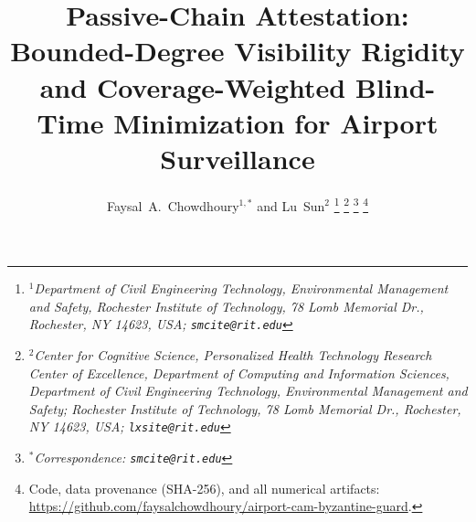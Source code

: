 \documentclass[journal]{IEEEtran}
\theoremstyle{remark}
\begin{document}
\title{Passive-Chain Attestation: Bounded-Degree Visibility Rigidity and Coverage-Weighted Blind-Time Minimization for Airport Surveillance}

\author{Faysal~A.~Chowdhoury$^{1,*}$ and Lu~Sun$^{2}$%
\thanks{\textit{$^{1}$Department of Civil Engineering Technology, Environmental Management and Safety, Rochester Institute of Technology, 78 Lomb Memorial Dr., Rochester, NY 14623, USA; \nolinkurl{smcite@rit.edu}}}%
\thanks{\textit{$^{2}$Center for Cognitive Science, Personalized Health Technology Research Center of Excellence, Department of Computing and Information Sciences, Department of Civil Engineering Technology, Environmental Management and Safety; Rochester Institute of Technology, 78 Lomb Memorial Dr., Rochester, NY 14623, USA; \nolinkurl{lxsite@rit.edu}}}%
\thanks{\textit{$^{*}$Correspondence: \nolinkurl{smcite@rit.edu}}}%
\thanks{Code, data provenance (SHA-256), and all numerical artifacts:
\url{https://github.com/faysalchowdhoury/airport-cam-byzantine-guard}.}}


\maketitle
\end{document}
